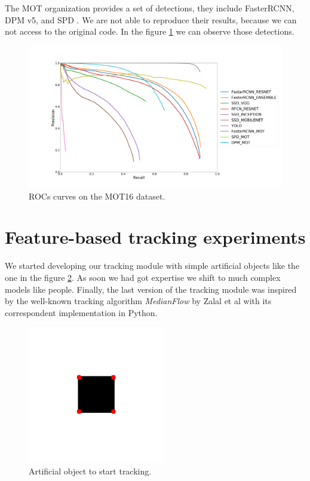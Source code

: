 The MOT organization provides a set of detections, they include FasterRCNN, DPM v5, and SPD \cite{spd}. We are not able to reproduce their results, because we can not access to the original code. In the figure \ref{experimDet3} we can observe those detections.




\begin{figure}[H]
\centering         
\includegraphics[width=0.9\linewidth]{evaluacionObject/motdetece.png}
\caption{ROCs curves on the MOT16 dataset.} \label{experimDet3}
\end{figure}


\section{Feature-based tracking experiments}\label{trackingsesad}



We started developing our tracking module with simple artificial objects like the one in the figure \ref{trs}. As soon we had got expertise we shift to much complex models like people. Finally, the last version of the tracking module was inspired by the well-known tracking algorithm \textit{MedianFlow} by Zalal et al\cite{medianFlow} with its correspondent implementation in Python\cite{medianFlowPython}.
 

\begin{figure}[H]
\centering         
\includegraphics[width=6cm]{tracker/scale1points.png}
\caption{Artificial object to start tracking.} \label{trs}
\end{figure}





